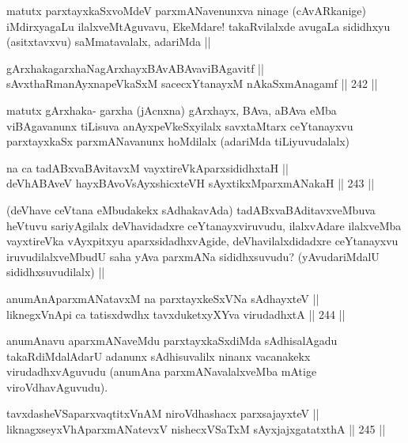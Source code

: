 \begin{artha}
matutx parxtayxkaSxvoMdeV parxmANavenunxva ninage (cAvARkanige) iMdirxyagaLu ilalxveMtAguvavu, EkeMdare! takaRvilalxde avugaLa sididhxyu (asitxtavxvu) saMmatavalalx, adariMda ||
\end{artha}

\begin{shl}
gArxhakagarxhaNagArxhayxBAvABAvaviBAgavitf || \\
sAvxthaRmanAyxnapeVkaSxM sacecxYtanayxM nAkaSxmAnagamf ||  242 ||  
\end{shl}

\begin{artha}
matutx gArxhaka- garxha (jAcnxna) gArxhayx, BAva, aBAva eMba viBAgavanunx tiLisuva anAyxpeVkeSxyilalx savxtaMtarx ceYtanayxvu parxtayxkaSx parxmANavanunx hoMdilalx (adariMda tiLiyuvudalalx) 
\end{artha}

\begin{shl}
na ca tadABxvaBAvitavxM vayxtireVkAparxsididhxtaH || \\
deVhABAveV hayxBAvoV\s sAyxshicxteVH sAyxtikxMparxmANakaH ||  243 ||  
\end{shl}

\begin{artha}
(deVhave ceVtana eMbudakekx sAdhakavAda) tadABxvaBAditavxveMbuva heVtuvu sariyAgilalx deVhavidadxre ceYtanayxviruvudu, ilalxvAdare ilalxveMba vayxtireVka vAyxpitxyu aparxsidadhxvAgide, deVhavilalxdidadxre ceYtanayxvu iruvudilalxveMbudU saha yAva parxmANa sididhxsuvudu? (yAvudariMdalU sididhxsuvudilalx) ||
\end{artha}

\begin{shl}
anumAnAparxmANatavxM na parxtayxkeSxVNa sAdhayxteV || \\
liknegxVnApi ca tatisxdwdhx tavxduketxyXYva virudadhxtA ||  244 ||  
\end{shl}

\begin{artha}
anumAnavu aparxmANaveMdu parxtayxkaSxdiMda sAdhisalAgadu takaRdiMdalAdarU adanunx sAdhisuvalilx ninanx vacanakekx virudadhxvAguvudu (anumAna parxmANavalalxveMba mAtige viroVdhavAguvudu).
\end{artha}

\begin{shl}
tavxdasheVSaparxvaqtitxVnAM niroVdhashacx parxsajayxteV || \\
liknagxseyxVhAparxmANatevxV nishecxVSaTxM sAyxjajxgatatxthA ||  245 ||  
\end{shl}

